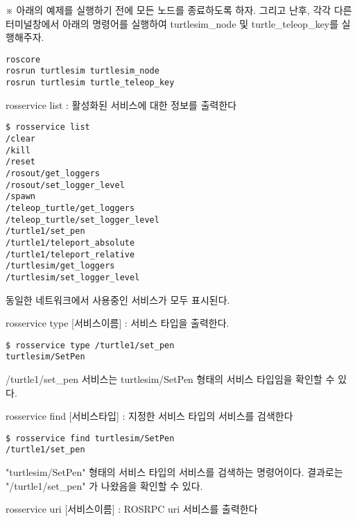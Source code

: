 \vspace{\baselineskip}
\noindent
※ 아래의 예제를 실행하기 전에 모든 노드를 종료하도록 하자. 그리고 난후, 각각 다른 터미널창에서 아래의 명령어를 실행하여 turtlesim\_node 및 turtle\_teleop\_key를 실행해주자.

\begin{lstlisting}[language=ROS]
roscore
rosrun turtlesim turtlesim_node 
rosrun turtlesim turtle_teleop_key
\end{lstlisting}

\setcounter{num}{0}

\vspace{\baselineskip}
\noindent
{}\circled{\thenum} rosservice list : 활성화된 서비스에 대한 정보를 출력한다

\begin{lstlisting}[language=ROS]
$ rosservice list
/clear
/kill
/reset
/rosout/get_loggers
/rosout/set_logger_level
/spawn
/teleop_turtle/get_loggers
/teleop_turtle/set_logger_level
/turtle1/set_pen
/turtle1/teleport_absolute
/turtle1/teleport_relative
/turtlesim/get_loggers
/turtlesim/set_logger_level
\end{lstlisting}

\noindent
동일한 네트워크에서 사용중인 서비스가 모두 표시된다.

\vspace{\baselineskip}
\noindent
{}\circled{\thenum} rosservice type [서비스이름] : 서비스 타입을 출력한다.

\begin{lstlisting}[language=ROS]
$ rosservice type /turtle1/set_pen
turtlesim/SetPen
\end{lstlisting}

\noindent
/turtle1/set\_pen 서비스는 turtlesim/SetPen 형태의 서비스 타입임을 확인할 수 있다.

\vspace{\baselineskip}
\noindent
{}\circled{\thenum} rosservice find [서비스타입] : 지정한 서비스 타입의 서비스를 검색한다

\begin{lstlisting}[language=ROS]
$ rosservice find turtlesim/SetPen
/turtle1/set_pen
\end{lstlisting}

\noindent
"turtlesim/SetPen" 형태의 서비스 타입의 서비스를 검색하는 명령어이다. 결과로는 "/turtle1/set\_pen" 가 나왔음을 확인할 수 있다.

\vspace{\baselineskip}
\noindent
{}\circled{\thenum} rosservice uri [서비스이름] : ROSRPC uri 서비스를 출력한다

